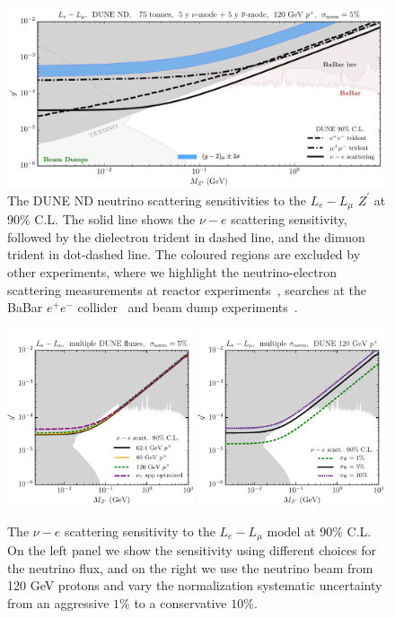 %
\begin{figure}[t]
\centering
\includegraphics[width=\textwidth]{lelmu.pdf}
 \caption[DUNE sensitivities to a $L_e - L_\mu$ $Z^\prime$.]{The DUNE ND neutrino scattering sensitivities to the $L_e - L_\mu$ $Z^\prime$ at 90\% C.L. The solid line shows the $\nu-e$ scattering sensitivity, followed by the dielectron trident in dashed line, and the dimuon trident in dot-dashed line. The coloured regions are excluded by other experiments, where we highlight the neutrino-electron scattering measurements at reactor experiments~\cite{Wong:2006nx,Deniz:2009mu,Chen:2014dsa}, searches at the BaBar $e^+e^-$ collider~\cite{Lees:2014xha, Lees:2017lec} and beam dump experiments~\cite{Bauer:2018onh}.\label{fig:Le_Lmu}}
\end{figure}
%
\begin{figure}[t]
\centering
    \includegraphics[width=0.49\textwidth]{lelmu_fluxes.pdf}
    \includegraphics[width=0.49\textwidth]{lelmu_sys.pdf}
 \caption[DUNE sensitivity to a $L_e - L_\mu$ $Z^\prime$ with alternative assumptions.]{The $\nu-e$ scattering sensitivity to the $L_e - L_\mu$ model at 90\% C.L. On the left panel we show the sensitivity using different choices for the neutrino flux, and on the right we use the neutrino beam from 120 GeV protons and vary the normalization systematic uncertainty from an aggressive $1\%$ to a conservative $10\%$. \label{fig:Le_Lmu_varied}}
\end{figure}
%
